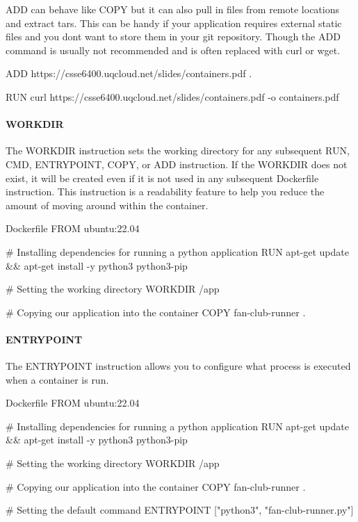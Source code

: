 \documentclass{csse4400}
\begin{document}
ADD can behave like COPY but it can also pull in files from remote locations and extract tars.
This can be handy if your application requires external static files and you dont want to store them in your git repository.
Though the ADD command is usually not recommended and is often replaced with curl or wget.

\begin{code}[language=docker,numbers=none]{}
ADD https://csse6400.uqcloud.net/slides/containers.pdf .
\end{code}
\begin{code}[language=docker,numbers=none]{}
RUN curl https://csse6400.uqcloud.net/slides/containers.pdf -o containers.pdf
\end{code}

\paragraph{WORKDIR}
The WORKDIR instruction sets the working directory for any subsequent RUN, CMD, ENTRYPOINT, COPY, or ADD instruction.
If the WORKDIR does not exist, it will be created even if it is not used in any subsequent Dockerfile instruction.
This instruction is a readability feature to help you reduce the amount of moving around within the container.

\begin{code}[language=docker,numbers=none]{Dockerfile}
FROM ubuntu:22.04

# Installing dependencies for running a python application
RUN apt-get update && apt-get install -y python3 python3-pip

# Setting the working directory
WORKDIR /app

# Copying our application into the container
COPY fan-club-runner .
\end{code}


\paragraph{ENTRYPOINT}
The ENTRYPOINT instruction allows you to configure what process is executed when a container is run.

\begin{code}[language=docker,numbers=none]{Dockerfile}
FROM ubuntu:22.04

# Installing dependencies for running a python application
RUN apt-get update && apt-get install -y python3 python3-pip

# Setting the working directory
WORKDIR /app

# Copying our application into the container
COPY fan-club-runner .

# Setting the default command
ENTRYPOINT ["python3", "fan-club-runner.py"]
\end{code}
\end{document}
